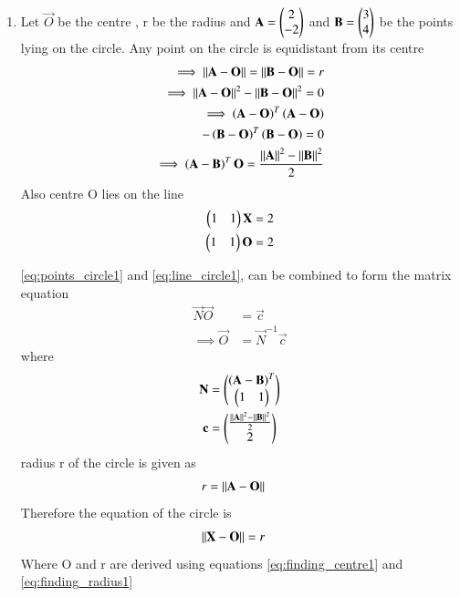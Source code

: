 \renewcommand{\theequation}{\theenumi}
\begin{enumerate}[label=\thesection.\arabic*.,ref=\thesection.\theenumi]

\item Let $\vec{O}$ be the centre , r be the radius and $\mathbf{A}=\begin{pmatrix}2\\-2\end{pmatrix}$ and $\mathbf{B}=\begin{pmatrix}3\\4\end{pmatrix}$ be the points lying on the circle.
\newline
Any point on the circle is equidistant from its centre
\begin{align}
\implies \left\lVert\mathbf{A}-\mathbf{O}\right\rVert = \left\lVert\mathbf{B}-\mathbf{O}\right\rVert = r
\\
\implies \left\lVert\mathbf{A}-\mathbf{O}\right\rVert^2 - \left\lVert\mathbf{B}-\mathbf{O}\right\rVert^2  = 0
\\
\implies \left(\mathbf{A}-\mathbf{O}\right)^T\left(\mathbf{A}-\mathbf{O}\right) 
\\
- \left(\mathbf{B}-\mathbf{O}\right)^T\left(\mathbf{B}-\mathbf{O}\right) = 0
\\
\implies \left(\mathbf{A}-\mathbf{B}\right)^T\mathbf{O} =   \frac{\left\lVert\mathbf{A}\right\rVert^2- \left\lVert\mathbf{B}\right\rVert^2}{2}
\label{eq:points_circle1}
\end{align}
Also centre O lies on the line
\begin{align}
\begin{pmatrix}1&1\end{pmatrix} \mathbf{X} = 2
\\
\begin{pmatrix}1&1\end{pmatrix} \mathbf{O} = 2
\label{eq:line_circle1}
\end{align}

\eqref{eq:points_circle1} and \eqref{eq:line_circle1}, can be combined to form the matrix equation
\begin{align}
\vec{N}\vec{O} &= \vec{c}
\\
\implies \vec{O} &= \vec{N}^{-1} \vec{c}
\label{eq:finding_centre1}
\end{align}
%
where 
%
\begin{align}
\mathbf{N} &= \begin{pmatrix}\left(\mathbf{A}-\mathbf{B}\right)^{T} \\ \begin{pmatrix}1&1\end{pmatrix}\end{pmatrix}
\\
\mathbf{c} &= \begin{pmatrix}\frac{\left\lVert\mathbf{A}\right\rVert^2- \left\lVert\mathbf{B}\right\rVert^2}{2} \\ 2\end{pmatrix}
\end{align}
radius r of the circle is given as
\begin{align}
r &= \left\lVert\mathbf{A}-\mathbf{O}\right\rVert
\label{eq:finding_radius1}
\end{align}
Therefore the equation of the circle is 
\begin{align}
\left\lVert\mathbf{X}-\mathbf{O}\right\rVert &=r
\end{align}
Where O and r are derived using equations \ref{eq:finding_centre1} and \ref{eq:finding_radius1}


\end{enumerate}
